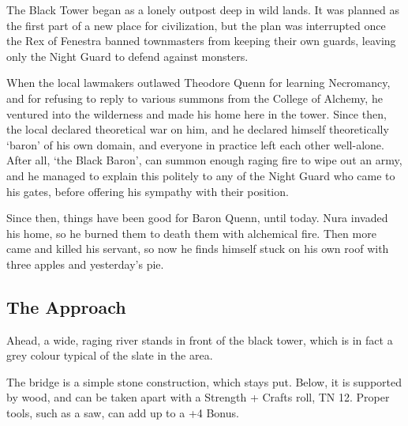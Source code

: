 \begin{multicols}{2}

\begin{exampletext}

  The Black Tower began as a lonely outpost deep in wild lands.
  It was planned as the first part of a new place for civilization, but the plan was interrupted once the Rex of Fenestra banned townmasters from keeping their own guards, leaving only the Night Guard to defend against monsters.

  When the local lawmakers outlawed Theodore Quenn for learning Necromancy, and for refusing to reply to various summons from the College of Alchemy, he ventured into the wilderness and made his home here in the tower.
  Since then, the local declared theoretical war on him, and he declared himself theoretically `baron' of his own domain, and everyone in practice left each other well-alone.
  After all, `the Black Baron', can summon enough raging fire to wipe out an army, and he managed to explain this politely to any of the Night Guard who came to his gates, before offering his sympathy with their position.

  Since then, things have been good for Baron Quenn, until today.
  Nura invaded his home, so he burned them to death them with alchemical fire.
  Then more came and killed his servant, so now he finds himself stuck on his own roof with three apples and yesterday's pie.

\end{exampletext}


\subsection{The Approach}

\begin{boxtext}

  Ahead, a wide, raging river stands in front of the black tower, which is in fact a grey colour typical of the slate in the area.

\end{boxtext}


The bridge is a simple stone construction, which stays put.
Below, it is supported by wood, and can be taken apart with a Strength + Crafts roll, TN 12.
Proper tools, such as a saw, can add up to a +4 Bonus.


\end{multicols}
